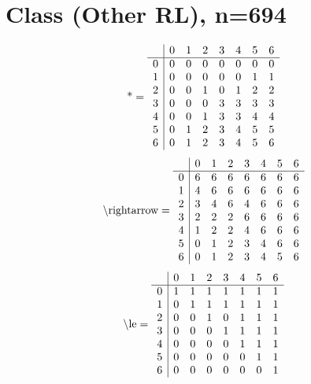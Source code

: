 \documentclass[11pt]{article}
\begin{document}
\section{Class (Other RL), n=694}
\[\text{*} = 
\begin{array}{r | r r r r r r r}
 & 0 & 1 & 2 & 3 & 4 & 5 & 6 \\ \hline
0 & 0 & 0 & 0 & 0 & 0 & 0 & 0 \\
1 & 0 & 0 & 0 & 0 & 0 & 1 & 1 \\
2 & 0 & 0 & 1 & 0 & 1 & 2 & 2 \\
3 & 0 & 0 & 0 & 3 & 3 & 3 & 3 \\
4 & 0 & 0 & 1 & 3 & 3 & 4 & 4 \\
5 & 0 & 1 & 2 & 3 & 4 & 5 & 5 \\
6 & 0 & 1 & 2 & 3 & 4 & 5 & 6 \\
\end{array}
\]
\[\text{\textbackslash rightarrow} = 
\begin{array}{r | r r r r r r r}
 & 0 & 1 & 2 & 3 & 4 & 5 & 6 \\ \hline
0 & 6 & 6 & 6 & 6 & 6 & 6 & 6 \\
1 & 4 & 6 & 6 & 6 & 6 & 6 & 6 \\
2 & 3 & 4 & 6 & 4 & 6 & 6 & 6 \\
3 & 2 & 2 & 2 & 6 & 6 & 6 & 6 \\
4 & 1 & 2 & 2 & 4 & 6 & 6 & 6 \\
5 & 0 & 1 & 2 & 3 & 4 & 6 & 6 \\
6 & 0 & 1 & 2 & 3 & 4 & 5 & 6 \\
\end{array}
\]
\[\text{\textbackslash le} = 
\begin{array}{r | r r r r r r r}
 & 0 & 1 & 2 & 3 & 4 & 5 & 6 \\ \hline
0 & 1 & 1 & 1 & 1 & 1 & 1 & 1 \\
1 & 0 & 1 & 1 & 1 & 1 & 1 & 1 \\
2 & 0 & 0 & 1 & 0 & 1 & 1 & 1 \\
3 & 0 & 0 & 0 & 1 & 1 & 1 & 1 \\
4 & 0 & 0 & 0 & 0 & 1 & 1 & 1 \\
5 & 0 & 0 & 0 & 0 & 0 & 1 & 1 \\
6 & 0 & 0 & 0 & 0 & 0 & 0 & 1 \\
\end{array}
\]
\end{document}

